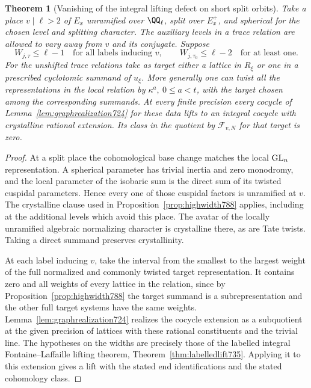\documentclass[a4paper,11pt]{article}
\newtheorem{theorem}[proposition]{Theorem}
\theoremstyle{definition}
\theoremstyle{remark}
\numberwithin{equation}{section}
\begin{document}
\begin{theorem}[Vanishing of the integral lifting defect on short split orbits]
\leavevmode\label{thm:highlift788}
Take a place \(v\mid\ell>2\) of \(E_x\) unramified
over \(\QQ_\ell\), split over \(E_x^+\), and spherical
for the chosen level and splitting character. The
auxiliary levels in a trace relation are allowed to
vary away from \(v\) and its conjugate. Suppose
\[
 W_{j,\tau}\le\ell-1\quad
       \text{for all labels inducing }v,\qquad
 W_{j,\tau_0}\le\ell-2\quad\text{for at least one.}
\]
For the unshifted trace relations take as target either
a lattice in \(R_\xi\) or one in a prescribed cyclotomic
summand of \(u_\xi\). More generally one can twist all
the representations in the local relation by
\(\kappa^a,\ 0\le a<t\), with the target chosen among
the corresponding summands. At every finite precision
every cocycle of Lemma~\ref{lem:graphrealization724} for
these data lifts to an integral cocycle with crystalline
rational extension. Its class in the quotient by
\(\mathcal F_{v,N}\) for that target is zero.
\end{theorem}
\begin{proof}
At a split place the cohomological base change matches
the local \({\rm GL}_n\) representation. A spherical
parameter has trivial inertia and zero monodromy, and
the local parameter of the isobaric sum is the direct
sum of its twisted cuspidal parameters. Hence every
one of those cuspidal factors is unramified at \(v\).
The crystalline clause used in
Proposition~\ref{prop:highwidth788} applies, including
at the additional levels which avoid this place. The
avatar of the locally unramified algebraic normalizing
character is crystalline there, as are Tate twists.
Taking a direct summand preserves crystallinity.

At each label inducing \(v\), take the interval from
the smallest to the largest weight of the full
normalized and commonly twisted target representation.
It contains zero and all weights of every lattice in
the relation, since by Proposition~\ref{prop:highwidth788}
the target summand is a subrepresentation and the
other full target systems have the same weights.
Lemma~\ref{lem:graphrealization724} realizes the
cocycle extension as a subquotient at the given
precision of lattices with these rational constituents
and the trivial line. The hypotheses on the widths
are precisely those of the labelled integral
Fontaine--Laffaille lifting theorem,
Theorem~\ref{thm:labelledlift735}. Applying it to
this extension gives a lift with the stated end
identifications and the stated cohomology class.
\end{proof}
\end{document}
